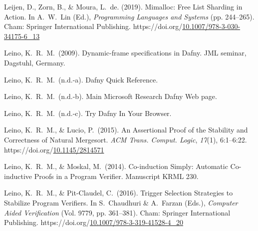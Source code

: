\documentclass[12pt,twoside]{article}
\begin{document}
{\begin{thebibliography}{1079}
\mdbibitemlabel{}Leijen, D., Zorn, B., \& Moura, L.~de. (2019). Mimalloc: Free List Sharding in Action. In A.~W.~Lin (Ed.), \emph{Programming Languages and Systems} (pp. 244–265). Cham: Springer International Publishing. https://doi.org/\href{https://dx.doi.org/10.1007/978-3-030-34175-6_13}{10.1007/978-3-030-34175-6\_13}%

\mdbibitemlabel{}Leino, K.~R.~M.~(2009). Dynamic-frame specifications in Dafny. JML seminar, Dagstuhl, Germany.%

\mdbibitemlabel{}Leino, K.~R.~M.~(n.d.-a). Dafny Quick Reference.%

\mdbibitemlabel{}Leino, K.~R.~M.~(n.d.-b). Main Microsoft Research Dafny Web page.%

\mdbibitemlabel{}Leino, K.~R.~M.~(n.d.-c). Try Dafny In Your Browser.%

\mdbibitemlabel{}Leino, K.~R.~M., \& Lucio, P.~(2015). An Assertional Proof of the Stability and Correctness of Natural Mergesort. \emph{ACM Trans. Comput. Logic}, \emph{17}(1), 6:1–6:22. https://doi.org/\href{https://dx.doi.org/10.1145/2814571}{10.1145/2814571}%

\mdbibitemlabel{}Leino, K.~R.~M., \& Moskal, M.~(2014). Co-induction Simply: Automatic Co-inductive Proofs in a Program Verifier. Manuscript KRML 230.%

\mdbibitemlabel{}Leino, K.~R.~M., \& Pit-Claudel, C.~(2016). Trigger Selection Strategies to Stabilize Program Verifiers. In S.~Chaudhuri \& A.~Farzan (Eds.), \emph{Computer Aided Verification} (Vol. 9779, pp. 361–381). Cham: Springer International Publishing. https://doi.org/\href{https://dx.doi.org/10.1007/978-3-319-41528-4_20}{10.1007/978-3-319-41528-4\_20}%


\end{thebibliography}}
\end{document}
